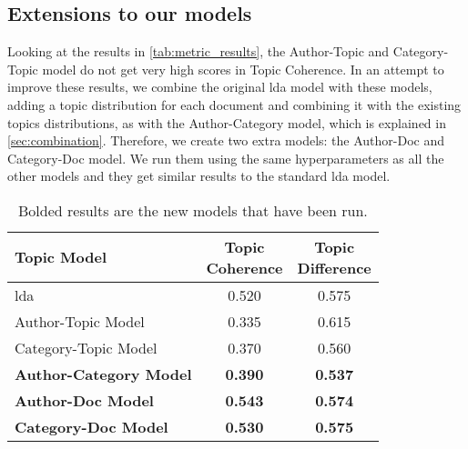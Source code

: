 \subsection{Extensions to our models}\label{subsec:app_exten_models}
Looking at the results in \autoref{tab:metric_results}, the Author-Topic and Category-Topic model do not get very high scores in Topic Coherence.
In an attempt to improve these results, we combine the original \gls{lda} model with these models, adding a topic distribution for each document and combining it with the existing topics distributions, as with the Author-Category model, which is explained in \autoref{sec:combination}.
Therefore, we create two extra models: the Author-Doc and Category-Doc model.
We run them using the same hyperparameters as all the other models and they get similar results to the standard \gls{lda} model.

\begin{table}[h]
	\centering
	\caption{Bolded results are the new models that have been run.}
	\begin{tabular}{l|c|c}
		Topic Model & \makecell{Topic \\ Coherence} & \makecell{Topic \\ Difference} \\
		\midrule
		\Acrlong{lda} & 0.520 & 0.575 \\
		Author-Topic Model & 0.335 & 0.615 \\
		Category-Topic Model & 0.370 & 0.560 \\
		\textbf{Author-Category Model} & \textbf{0.390} & \textbf{0.537} \\
		\textbf{Author-Doc Model} & \textbf{0.543} & \textbf{0.574} \\
		\textbf{Category-Doc Model} &\textbf{ 0.530} & \textbf{0.575} \\
	\end{tabular}
	\label{tab:_extra_metric_results}
\end{table}


